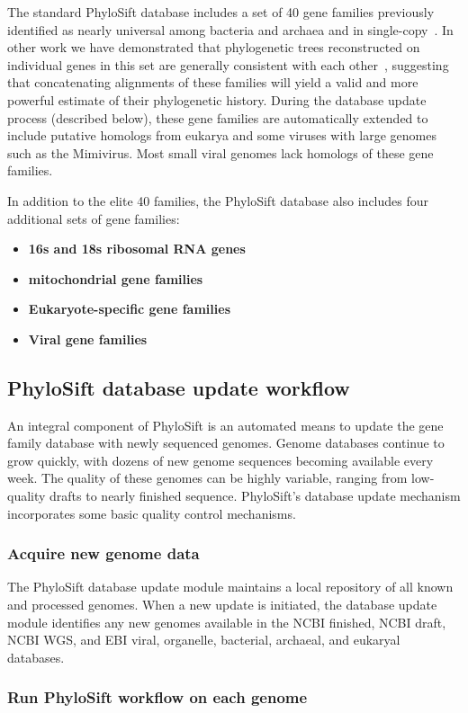 \documentclass[10pt]{article}
\begin{document}
The standard PhyloSift database includes a set of 40 gene families previously identified as nearly universal among bacteria and archaea and in single-copy~\cite{DongyingMarkers}.
In other work we have demonstrated that phylogenetic trees reconstructed on individual genes in this set are generally consistent with each other~\cite{Lang2012}, suggesting that concatenating alignments of these families will yield a valid and more powerful estimate of their phylogenetic history.
During the database update process (described below), these gene families are automatically extended to include putative homologs from eukarya and some viruses with large genomes such as the Mimivirus.
Most small viral genomes lack homologs of these gene families.

In addition to the elite 40 families, the PhyloSift database also includes four additional sets of gene families:
\begin{itemize}
\item \textbf{16s and 18s ribosomal RNA genes}
\item \textbf{mitochondrial gene families}
\item \textbf{Eukaryote-specific gene families}
\item \textbf{Viral gene families}
\end{itemize}

\subsection*{PhyloSift database update workflow}
An integral component of PhyloSift is an automated means to update the gene family database with newly sequenced genomes.
Genome databases continue to grow quickly, with dozens of new genome sequences becoming available every week.
The quality of these genomes can be highly variable, ranging from low-quality drafts to nearly finished sequence.
PhyloSift's database update mechanism incorporates some basic quality control mechanisms.
\subsubsection*{Acquire new genome data}
The PhyloSift database update module maintains a local repository of all known and processed genomes.
When a new update is initiated, the database update module identifies any new genomes available in the NCBI finished, NCBI draft, NCBI WGS, and EBI viral, organelle, bacterial, archaeal, and eukaryal databases. 
\subsubsection*{Run PhyloSift workflow on each genome}
\end{document}
